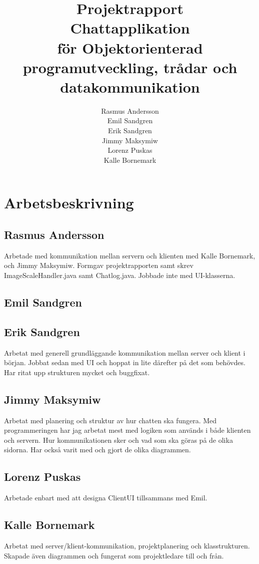 \documentclass[a4paper,11pt]{article}
\title{Projektrapport\\
\large{Chattapplikation}\\
\large{för Objektorienterad programutveckling, trådar och datakommunikation} }
\author{Rasmus Andersson\\Emil Sandgren\\Erik Sandgren\\Jimmy Maksymiw\\Lorenz Puskas\\Kalle Bornemark}
\begin{document}
\pagestyle{fancy}
\maketitle
\newpage
\tableofcontents
\newpage

\section{Arbetsbeskrivning}

\subsection{Rasmus Andersson} 
Arbetade med kommunikation mellan servern och klienten med Kalle Bornemark, och Jimmy Maksymiw. Formgav projektrapporten samt skrev ImageScaleHandler.java samt Chatlog.java. Jobbade inte med UI-klasserna.

\subsection{Emil Sandgren} 
\subsection{Erik Sandgren} 

Arbetat med generell grundläggande kommunikation mellan server och klient i början. Jobbat sedan med UI och hoppat in lite därefter på det som behövdes. Har ritat upp strukturen mycket och buggfixat.

\subsection{Jimmy Maksymiw} 
Arbetat med planering och struktur av hur chatten ska fungera. Med programmeringen har jag arbetat mest med logiken som används i både klienten och servern. Hur kommunikationen sker och vad som ska göras på de olika sidorna. Har också varit med och gjort de olika diagrammen. 
\subsection{Lorenz Puskas} 
Arbetade enbart med att designa ClientUI tillsammans med Emil.
\subsection{Kalle Bornemark} 
Arbetat med server/klient-kommunikation, projektplanering och klasstrukturen. Skapade även diagrammen och fungerat som projektledare till och från.
\end{document}

